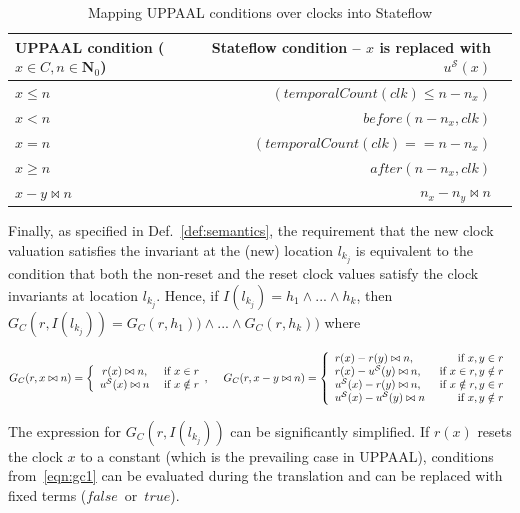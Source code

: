 \begin{table}[!t]
{
\centering
\begin{tabular}{|l|r|r|}
\hline
UPPAAL condition ($x\in C,n\in \mathbf{N}_0$) & Stateflow condition --  $x$ is replaced with $u^\mathcal{S}(x)$ \\
\hline
$x\leq n$ &  $(temporalCount(clk)\leq n-n_x)$ \\
$x< n$  & $before(n-n_x,clk)$ \\
$x= n$   & $(temporalCount(clk)==n-n_x)$ \\
$x\geq n$  & $after(n-n_x,clk)$ \\
$x-y\bowtie n$  & $n_x-n_y\bowtie n$  \\
\hline
\end{tabular}
}
\caption{Mapping UPPAAL conditions over clocks into Stateflow}
\label{tab:UP2SF_clocks}
\end{table}



Finally, as specified in Def.~\ref{def:semantics}, the requirement that the new clock valuation satisfies the invariant at the (new) location $l_{k_j}$ is equivalent to the condition that both the non-reset and the reset clock values satisfy the clock invariants at location $l_{k_j}$. Hence, if $I(l_{k_j})=h_1\wedge ...\wedge h_k$, then $G_C(r,I(l_{k_j}))=G_C(r,h_1))\wedge...\wedge G_C(r,h_k))$ where

\footnotesize
\vspace{-10pt}
\begin{equation}
\label{eqn:gc1}
G_C(r,x\bowtie n) = \left\{
\begin{array}{cc} 
r(x)\bowtie n, & \hbox{ if } x\in r\\
u^\mathcal{S}(x)\bowtie n & \hbox{ if } x\notin r 				
\end{array},
\right. 
\hspace{10pt}
G_C(r,x-y\bowtie n) = 
\left\{
\begin{array}{lr} 
r(x)-r(y)\bowtie n, & \hbox{ if } x,y\in r\\
r(x)-u^\mathcal{S}(y)\bowtie n, & \hbox{ if } x\in r,y\notin r\\
u^\mathcal{S}(x)-r(y)\bowtie n, & \hbox{ if } x\notin r,y\in r\\
u^\mathcal{S}(x)-u^\mathcal{S}(y)\bowtie n & \hbox{ if } x,y\notin r													  
\end{array}
\right.
\end{equation}
\normalsize

\noindent 
The expression for $G_C(r,I(l_{k_j}))$ can be significantly simplified. If $r(x)$ resets the clock $x$ to a constant (which is the prevailing case in UPPAAL), conditions from~\eqref{eqn:gc1} can be evaluated during the translation and can be replaced with fixed terms ($false$~or~$true$).



